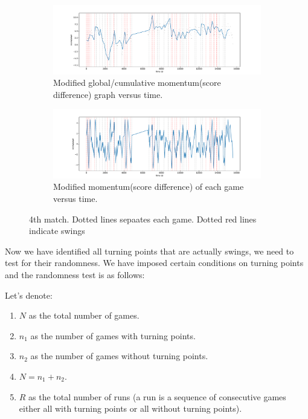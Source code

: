 \documentclass[UTF8]{mcmthesis}
\begin{document}
	\begin{figure}[H]
		\centering
		
		\begin{subfigure}[b]{\textwidth}
			\includegraphics[width=1\linewidth]{figs/fig4_3.pdf}
			\caption{Modified global/cumulative momentum(score difference) graph versus time.}
			\label{fig:topfig4_3}
		\end{subfigure}
		
		\vspace{1cm}
		
		\begin{subfigure}[b]{1.0\textwidth}
			\includegraphics[width=1\linewidth]{figs/fig5_3.pdf}
			\caption{Modified momentum(score difference) of each game versus time.}
			\label{fig:bottomfig5_3}
		\end{subfigure}
		
		\caption{4th match. Dotted lines sepaates each game. Dotted red lines indicate swings}
		\label{fig:both_figures3}
	\end{figure}
	
	Now we have identified all turning points that are actually swings, we need to test for their randomness. We have imposed certain conditions on turning points and the randomness test is as follows:
		
	Let's denote:
	\begin{enumerate}
		\item \( N \) as the total number of games.
		\item \( n_1 \) as the number of games with turning points.
		\item \( n_2 \) as the number of games without turning points.
		\item \( N = n_1 + n_2 \).
		\item \( R \) as the total number of runs (a run is a sequence of consecutive games either all with turning points or all without turning points).
	\end{enumerate}
		
\end{document}
